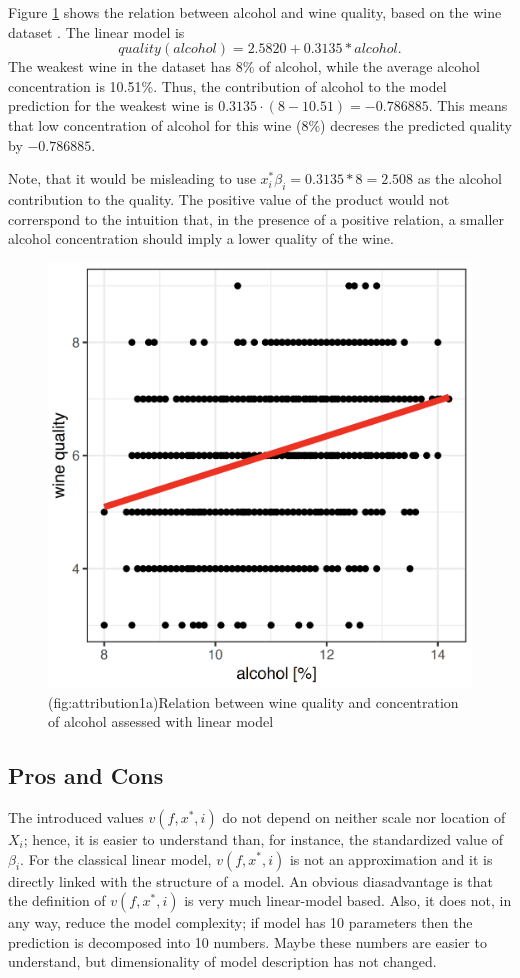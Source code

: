 \documentclass[12pt,]{krantz}
\theoremstyle{definition}
\theoremstyle{definition}
\theoremstyle{definition}
\theoremstyle{remark}
\begin{document}
Figure \ref{fig:attribution1a} shows the relation between alcohol and
wine quality, based on the wine dataset \citep{wine2009}. The linear
model is \[
quality(alcohol) = 2.5820 + 0.3135 * alcohol.
\] The weakest wine in the dataset has 8\% of alcohol, while the average
alcohol concentration is 10.51\%. Thus, the contribution of alcohol to
the model prediction for the weakest wine is
\(0.3135 \cdot (8-10.51) = -0.786885\). This means that low
concentration of alcohol for this wine (8\%) decreses the predicted
quality by \(-0.786885\).

Note, that it would be misleading to use
\(x_i^*\beta_i = 0.3135*8 = 2.508\) as the alcohol contribution to the
quality. The positive value of the product would not correrspond to the
intuition that, in the presence of a positive relation, a smaller
alcohol concentration should imply a lower quality of the wine.

\begin{figure}

{\centering \includegraphics[width=0.5\linewidth]{figure/attribution_1} 

}

\caption{(fig:attribution1a)Relation between wine quality and concentration of alcohol assessed with linear model}\label{fig:attribution1a}
\end{figure}

\hypertarget{pros-and-cons-4}{%
\subsection{Pros and Cons}\label{pros-and-cons-4}}

The introduced values \(v(f, x^*, i)\) do not depend on neither scale
nor location of \(X_i\); hence, it is easier to understand than, for
instance, the standardized value of \(\beta_i\). For the classical
linear model, \(v(f, x^*, i)\) is not an approximation and it is
directly linked with the structure of a model. An obvious diasadvantage
is that the definition of \(v(f, x^*, i)\) is very much linear-model
based. Also, it does not, in any way, reduce the model complexity; if
model has 10 parameters then the prediction is decomposed into 10
numbers. Maybe these numbers are easier to understand, but
dimensionality of model description has not changed.
\end{document}
